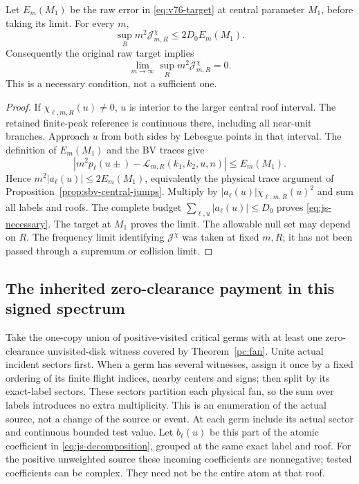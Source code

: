\begin{theorem}
\label{thm:js-raw-necessary}
Let $E_m(M_1)$ be the raw error in \eqref{eq:v76-target}
at central parameter $M_1$, before taking its limit.
For every $m$,
\begin{equation}\label{eq:js-necessary}
 \sup_R m^2\mathcal J^\chi_{m,R}\le2D_0E_m(M_1).
\end{equation}
Consequently the original raw target implies
\begin{equation}\label{eq:js-necessary-limit}
 \lim_{m\to\infty}\sup_R m^2\mathcal J^\chi_{m,R}=0.
\end{equation}
This is a necessary condition, not a sufficient one.
\end{theorem}
\begin{proof}
If $\chi_{\ell,m,R}(u)\ne0$, $u$ is interior to the
larger central roof interval. The retained finite-peak reference
is continuous there, including all near-unit branches.
Approach $u$ from both sides by Lebesgue points in that interval.
The definition of $E_m(M_1)$ and the BV traces give
\[
 |m^2p_\ell(u\pm)-\mathcal L_{m,R}(k_1,k_2,u,n)|
                       \le E_m(M_1).
\]
Hence $m^2|a_\ell(u)|\le2E_m(M_1)$, equivalently the
physical trace argument of Proposition~\ref{prop:sbv-central-jumps}.
Multiply by $|a_\ell(u)|\chi_{\ell,m,R}(u)^2$ and sum
all labels and roofs. The complete budget
$\sum_{\ell,u}|a_\ell(u)|\le D_0$ proves
\eqref{eq:js-necessary}. The target at $M_1$ proves the limit.
The allowable null set may depend on $R$. The frequency limit
identifying $\mathcal J^\chi$ was taken at fixed $m,R$;
it has not been passed through a supremum or collision limit.
\end{proof}

\subsection{The inherited zero-clearance payment in this signed spectrum}

Take the one-copy union of positive-visited critical germs with
at least one zero-clearance unvisited-disk witness covered by
Theorem~\ref{pc:fan}. Unite actual incident sectors first.
When a germ has several witnesses, assign it once by a fixed
ordering of its finite flight indices, nearby centers and signs;
then split by its exact-label sectors. These sectors partition
each physical fan, so the sum over labels introduces no extra
multiplicity. This is an enumeration
of the actual source, not a change of the source or event.
At each germ include its actual sector and continuous bounded
test value. Let $b_\ell(u)$ be this part of the atomic coefficient
in \eqref{eq:js-decomposition}, grouped at the same exact label
and roof. For the positive unweighted source these incoming
coefficients are nonnegative; tested coefficients can be complex.
They need not be the entire atom at that roof.

